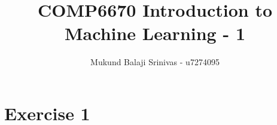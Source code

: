 \documentclass[a4paper]{article}
\title{COMP6670 Introduction to Machine Learning - 1}
\author{Mukund Balaji Srinivas - u7274095}
\begin{document}
	\maketitle
	\section*{Exercise 1}
	
\end{document}
